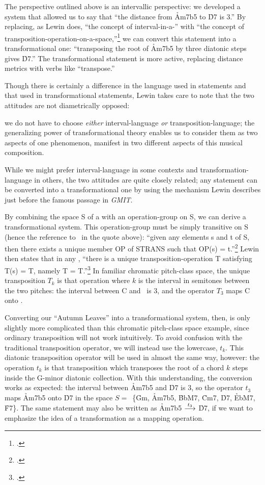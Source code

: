 The \gis{} perspective outlined above is an intervallic perspective: we developed
a system that allowed us to say that “the distance from \h{Am7b5} to \h{D7} is
3.” By replacing, as Lewin does, “the concept of interval-in-a-\gis{}” with “the
concept of transposition-operation-on-a-space,”\footcite[157]{lewin:gmit} we
can convert this \gis{} statement into a transformational one: “transposing the
root of \h{Am7b5} by three diatonic steps gives \h{D7}.” The transformational
statement is more active, replacing distance metrics with verbs like
“transpose.”

Though there is certainly a difference in the language used in \gis{} statements
and that used in transformational statements, Lewin takes care to note that
the two attitudes are not diametrically opposed:
\begin{quoting}
  \singlespacing
  we do not have to choose \emph{either} interval-language \emph{or}
  transposition-language; the generalizing power of transformational theory
  enables us to consider them as two aspects of one phenomenon, manifest in
  two different aspects of this musical composition.
\end{quoting}
While we might prefer interval-language in some contexts and
transformation-language in others, the two attitudes are quite closely
related; any \gis{} statement can be converted into a transformational one by
using the mechanism Lewin describes just before the famous passage in
\emph{GMIT}.

By combining the space S of a \gis{} with an operation-group on S, we can derive
a transformational system. This operation-group must be simply transitive on S
(hence the reference to \strans\ in the quote above): “given any elements s and
t of S, then there exists a unique member OP of STRANS such that OP(s) =
t.”\footcite[157]{lewin:gmit} Lewin then states that in any \gis{}, “there is a
unique transposition-operation T satisfying T(s) = T, namely T =
T.''\footcite[157]{lewin:gmit} In familiar chromatic pitch-class
space, the unique transposition $T_k$ is that operation where $k$ is the
interval in semitones between the two pitches: the interval between C and
\Eflat\ is 3, and the operator $T_3$ maps C onto \Eflat.

Converting our “Autumn Leaves” \gis{} into a transformational system, then, is
only slightly more complicated than this chromatic pitch-class space example, since
ordinary transposition will not work intuitively. To avoid confusion with the
traditional transposition operator, we will instead use the lowercase,
$t_k$. This diatonic transposition operator will be used in almost
the same way, however: the operation $t_k$ is that transposition which
transposes the root of a chord $k$ steps inside the G-minor diatonic
collection. With this understanding, the conversion works as expected: the
interval between \h{Am7b5} and \h{D7} is 3, so the operator $t_3$ maps
\h{Am7b5} onto \h{D7} in the space \mbox{$S =$ \{\h{Gm},} \h{Am7b5}, \h{BbM7},
\h{Cm7}, \h{D7}, \h{EbM7}, \h{F7}\}. The same statement may also be
written as \h{Am7b5} $\overset{t_3}{\longrightarrow}$ \h{D7}, if we want to emphasize the
idea of a transformation as a mapping operation.

